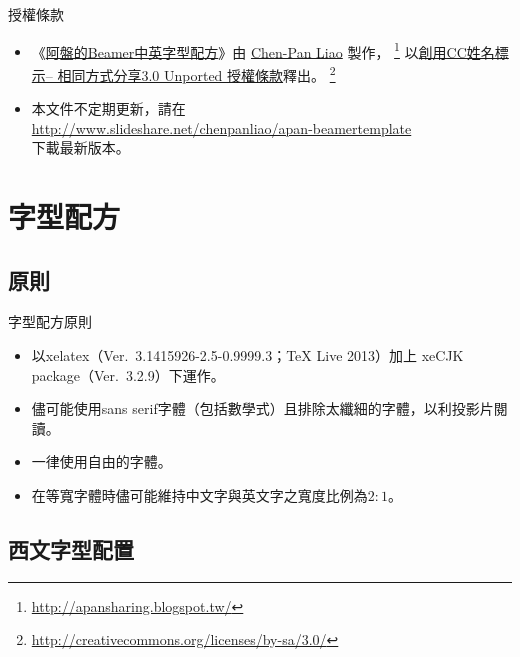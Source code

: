 \documentclass[10pt, aspectratio=1610]{beamer}
\let\oldfootnote\footnote
\renewcommand\footnote[1]{\hspace{-0.7em}\oldfootnote{\ignorespaces#1}\hspace{0.5em}}
\begin{document}
\begin{frame}{授權條款}
\begin{center}
\end{center}
\begin{itemize}
  \item 《\href{%
  http://www.scribd.com/doc/83967053/Apan-s-Beamer-Template%
}{阿盤的Beamer中英字型配方}》由 
  \href{http://apansharing.blogspot.tw/}{\alert{Chen-Pan Liao}}
  製作，%
  \footnote{\url{http://apansharing.blogspot.tw/}}
  以\href{http://creativecommons.org/licenses/by-sa/3.0/}%
  {\alert{創用CC姓名標示-- 相同方式分享3.0 Unported 授權條款}}釋出。%
  \footnote{\url{http://creativecommons.org/licenses/by-sa/3.0/}}\\

  \item 本文件不定期更新，請在\\
\url{http://www.slideshare.net/chenpanliao/apan-beamertemplate}\\
下載最新版本。
\end{itemize}
\end{frame}

\section{字型配方}

\subsection{原則}

\begin{frame}{字型配方原則}
\begin{itemize}
\item 以xelatex（Ver.~3.1415926-2.5-0.9999.3；TeX Live 2013）加上
      xeCJK package（Ver.~3.2.9）下運作。
\item 儘可能使用sans serif字體（包括數學式）且排除太纖細的字體，以利投影片閱讀。
\item 一律使用自由的字體。
\item 在等寬字體時儘可能維持中文字與英文字之寬度比例為$2:1$。
\end{itemize}
\end{frame}


\subsection{西文字型配置}
\end{document}
